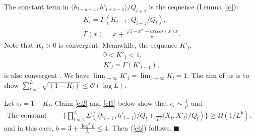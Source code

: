 \documentclass{article}
\newcommand{\cO}{\mathcal{O}}
\newcommand*{\QEDA}{\hfill\ensuremath{\blacksquare}}%
\begin{document}
The constant term in $\langle h_{l+a-1}, h'_{l+a-1} \rangle/Q_{l+a}$  is the sequence (Lemma \ref{io}):
\begin{equation}
\begin{aligned}
&K_l=\Gamma(K_{l-1}\cdot Q_{l-1}/Q_{l}),\\
&\Gamma(x)=x+\frac{\sqrt{1-x^2}-arccos(x)x}{\pi}.
\end{aligned}
\end{equation}
Note that $K_l>0$ is convergent. Meanwhile, the sequence $K'_l$,
\begin{equation}
\begin{aligned}
&0<K'_1<1,\\
&K'_l=\Gamma(K'_{l-1}),
\end{aligned}
\end{equation}
is also convergent \cite{huang2020deep}. We  have $\lim_{l\to \infty}K'_l=\lim_{l\to \infty}K_l=1$. The aim of us is to show $\sum_{l=1}^{L} \sqrt{(1-K_l)}\leq \cO(\log L)$.

Let $e_l=1-K_l$. Claim \ref{cl2} and \ref{cl1} below show that $e_l\sim \frac{1}{l^2}$ and
\begin{equation}
\begin{aligned}
\text{The constant term in }&\{\prod_{l=1}^{L}\Sigma(\langle h_{l-1}, h'_{l-1} \rangle/Q_{l}+ \frac{1}{L^3}\langle X_{l},X'_{l} \rangle/Q_{l})\}\geq \Omega(1/L^b).
\end{aligned}
\end{equation}
and  in this case, $b=3+\frac{\log^2L}{L}\leq 4$.
Then (\ref{eb}) follows.
\QEDA
\end{document}
